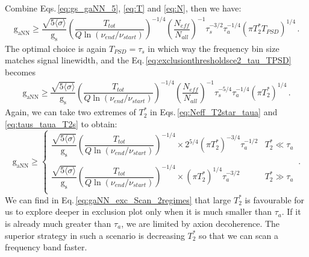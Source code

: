 Combine Eqs.\,\eqref{eq:gs_gaNN_5}, \eqref{eq:T} and \eqref{eq:N}, then we have:
\begin{align}
    \mathrm{g_{aNN}} \geqslant \dfrac{\sqrt{5 \langle\sigma\rangle}}{\mathrm{g_{s}}} 
    \left(\dfrac{T_{tot}}{Q \ln{ \left(\nu_{end}/\nu_{start} \right) } }\right)^{-1/4}      
    \left(\dfrac{N_{eff}}{N_{all}}\right)^{-1} \tau_s^{-3/2}  \tau_a^{-1/4} (\pi T_2^* T_{PSD})^{1/4}
    \,. \label{eq:exclusionthresholdsce2_tau_TPSD} 
\end{align}
The optimal choice is again $T_{PSD} = \tau_s$ in which way the frequency bin size matches signal linewidth, and the Eq.\,\eqref{eq:exclusionthresholdsce2_tau_TPSD} becomes
\begin{align}
    \mathrm{g_{aNN}} \geqslant \dfrac{\sqrt{5 \langle\sigma\rangle}}{\mathrm{g_{s}}} 
    \left(\dfrac{T_{tot}}{Q \ln{ \left(\nu_{end}/\nu_{start} \right) } }\right)^{-1/4} 
    \left(\dfrac{N_{eff}}{N_{all}}\right)^{-1} \tau_s^{-5/4} \tau_a^{-1/4} (\pi T_2^*)^{1/4}
    \,. \label{eq:exclusionthresholdsce2_tau} 
\end{align}
Again, we can take two extremes of $T_2^*$ in Eqs.\,\eqref{eq:Neff_T2star_taua} and \eqref{eq:taus_taua_T2s} to obtain:
\begin{equation}
    \mathrm{g_{aNN}} \geqslant \left\{
    \begin{array}{cl}
    \dfrac{\sqrt{5 \langle\sigma\rangle}}{\mathrm{g_{s}}} 
    \left(\dfrac{T_{tot}}{Q \ln{ \left(\nu_{end}/\nu_{start} \right) } }\right)^{-1/4}   
     \times 2^{5/4} (\pi T_2^*)^{-3/4} \tau_a^{-1/2} 
    &  T_2^* \ll \tau_a\\
     & \\
    \dfrac{\sqrt{5 \langle\sigma\rangle}}{\mathrm{g_{s}}} 
    \left(\dfrac{T_{tot}}{Q \ln{ \left(\nu_{end}/\nu_{start} \right) } }\right)^{-1/4}    
     \times (\pi T_2^*)^{1/4} \tau_a^{-3/2}
    &  T_2^*  \gg \tau_a\\
    \end{array} \right.
    \,.\label{eq:gaNN_exc_Scan_2regimes}
\end{equation}
We can find in Eq.\,\eqref{eq:gaNN_exc_Scan_2regimes} that large $T_2^*$ is favourable for us to explore deeper in exclusion plot only when it is much smaller than $\tau_a$. If it is already much greater than $\tau_a$, we are limited by axion decoherence. The superior strategy in such a scenario is decreasing $T_2^*$ so that we can scan a frequency band faster. 





